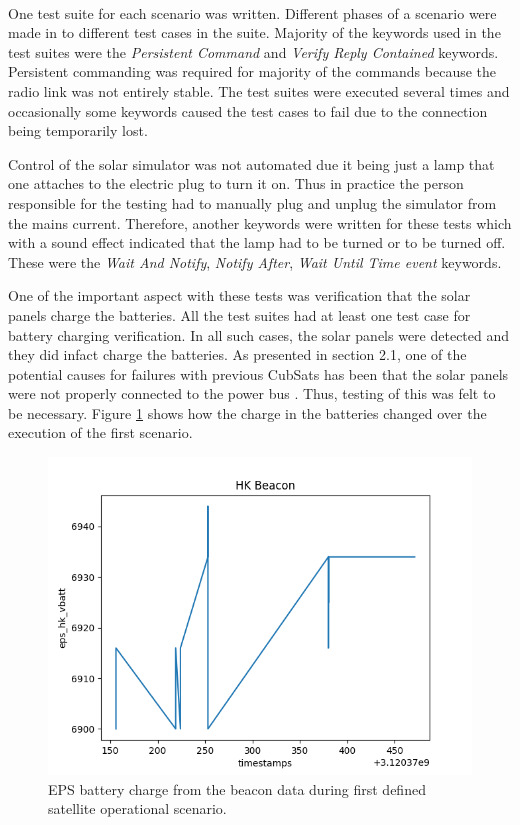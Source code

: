 \documentclass[english,12pt,a4paper,pdftex,elec,utf8]{aaltothesis}
\begin{document}
\\
One test suite for each scenario was written. Different phases of a scenario were made in to different test cases in the suite. Majority of the keywords used in the test suites were the \textit{Persistent Command} and \textit{Verify Reply Contained} keywords. Persistent commanding was required for majority of the commands because the radio link was not entirely stable. The test suites were executed several times and occasionally some keywords caused the test cases to fail due to the connection being temporarily lost.\par
Control of the solar simulator was not automated due it being just a lamp that one attaches to the electric plug to turn it on. Thus in practice the person responsible for the testing had to manually plug and unplug the simulator from the mains current. Therefore, another keywords were written for these tests which with a sound effect indicated that the lamp had to be turned or to be turned off. These were the \textit{Wait And Notify}, \textit{Notify After}, \textit{Wait Until Time event} keywords.\par
One of the important aspect with these tests was verification that the solar panels charge the batteries. All the test suites had at least one test case for battery charging verification. In all such cases, the solar panels were detected and they did infact charge the batteries. As presented in section 2.1, one of the potential causes for failures with previous CubSats has been that the solar panels were not properly connected to the power bus \cite{Swart1}. Thus, testing of this was felt to be necessary. Figure \ref{epsvbatt} shows how the charge in the batteries changed over the execution of the first scenario.
\begin{figure}[h!]
\centering
\includegraphics[scale=0.6]{hk_plot1}
\caption{EPS battery charge from the beacon data during first defined satellite operational scenario.}
\label{epsvbatt}
\end{figure}  
\end{document}
